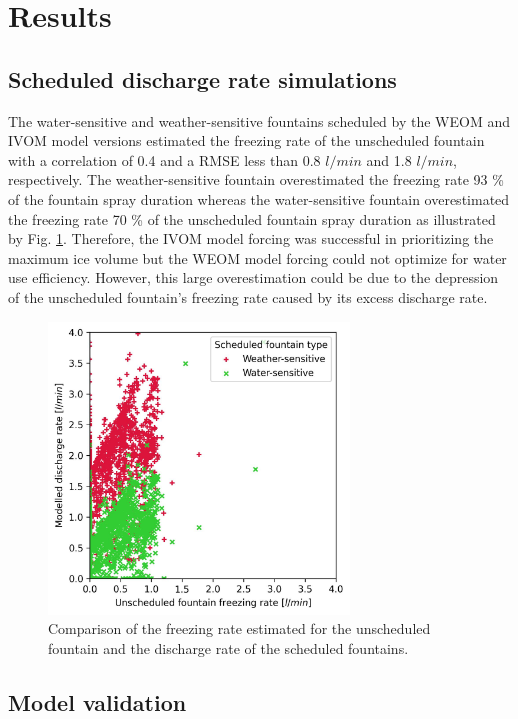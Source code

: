 \documentclass[tc, manuscript]{copernicus}
\begin{document}
\section{Results}

\subsection{Scheduled discharge rate simulations}

The water-sensitive and weather-sensitive fountains scheduled by the WEOM and IVOM model versions estimated the
freezing rate of the unscheduled fountain with a correlation of 0.4 and a RMSE less than 0.8 $l/min$ and 1.8
$l/min$, respectively. The weather-sensitive fountain overestimated the freezing rate 93 \% of the fountain spray
duration whereas the water-sensitive fountain overestimated the freezing rate 70 \% of the unscheduled fountain
spray duration as illustrated by Fig. \ref{fig:simvsreal}. Therefore, the IVOM model forcing was successful in
prioritizing the maximum ice volume but the WEOM model forcing could not optimize for water use efficiency.
However, this large overestimation could be due to the depression of the unscheduled fountain's freezing rate
caused by its excess discharge rate. 

\begin{figure}[t]
\includegraphics[width=8cm]{Figures/simvsreal.jpg}

\caption{ Comparison of the freezing rate estimated for the unscheduled fountain and the discharge rate of the
scheduled fountains. }

\label{fig:simvsreal}
\end{figure}

\subsection{Model validation}
\end{document}
